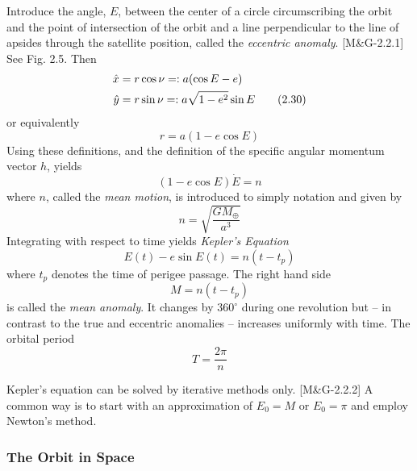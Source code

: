 \documentclass[11pt]{article}
\begin{document}
Introduce the angle, $E$, between the center of a circle
circumscribing the orbit and the point of intersection of the orbit
and a line perpendicular to the line of apsides through the satellite
position, called the {\em eccentric anomaly}. [M\&G-2.2.1] See Fig. 2.5. Then
\begin{align}
  \hat{x} &= r\cos\nu =: a(\cos E - e) \notag \\
  \hat{y} &= r\sin\nu =: a\sqrt{1 - e^2}\sin E \label{2.30}\tag{2.30}
\end{align}
or equivalently
\begin{equation}
  r = a(1 - e\cos E) \label{2.31}\tag{2.31}
\end{equation}
Using these definitions, and the definition of the specific angular
momentum vector $h$, yields
\begin{equation}
  (1 - e\cos E)\dot{E} = n \label{2.34}\tag{2.34}
\end{equation}
where $n$, called the {\em mean motion}, is introduced to simply
notation and given by
\begin{equation}
  n = \sqrt{\frac{GM_{\oplus}}{a^3}} \label{2.35}\tag{2.35}
\end{equation}
Integrating with respect to time yields {\em Kepler's Equation}
\begin{equation}
  E(t) - e\sin E(t) = n(t - t_p) \label{2.36}\tag{2.36}
\end{equation}
where $t_p$ denotes the time of perigee passage. The right hand side
\begin{equation}
  M = n(t - t_p) \label{2.37}\tag{2.37}
\end{equation}
is called the {\em mean anomaly}. It changes by $360^{\circ}$ during
one revolution but -- in contrast to the true and eccentric anomalies
-- increases uniformly with time. The orbital period 
\begin{equation}
  T = \frac{2\pi}{n} \label{2.39}\tag{2.39}
\end{equation}

Kepler's equation can be solved by iterative methods
only. [M\&G-2.2.2] A common way is to start with an approximation of $E_0 = M$ or
$E_0 = \pi$ and employ Newton's method.

\subsubsection{The Orbit in Space}
\end{document}
